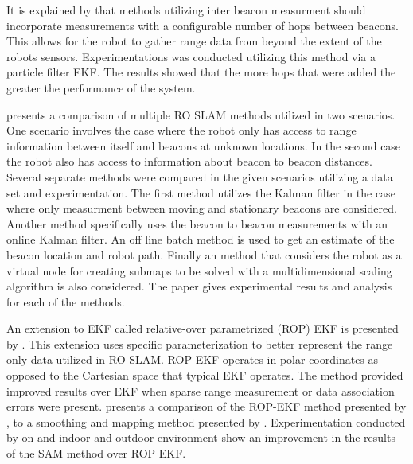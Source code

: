 \documentclass[conference]{IEEEtran}
\begin{document}
	\FloatBarrier
	
	
	
	It is explained by \cite{Torres-Gonzalez2015} that methods utilizing inter beacon measurment should incorporate measurements with a configurable number of hops between beacons. This allows for the robot to gather range data from beyond the extent of the robots sensors. Experimentations was conducted utilizing this method via a particle filter EKF. The results showed that the more hops that were added the greater the performance of the system. 
	
	
	
	\cite{Djugash2006} presents a comparison of multiple RO SLAM methods utilized in two scenarios. One scenario involves the case where the robot only has access to range information between itself and beacons at unknown locations. In the second case the robot also has access to information about beacon to beacon distances. Several separate methods were compared in the given scenarios utilizing a data set and experimentation. The first method utilizes the Kalman filter in the case where only measurment between moving and stationary beacons are considered. Another method specifically uses the beacon to beacon measurements with an online Kalman filter. An off line batch method is used to get an estimate of the beacon location and robot path. Finally an method that considers the robot as a virtual node for creating submaps to be solved with a multidimensional scaling algorithm is also considered. The paper gives experimental results and analysis for each of the methods. 
	
	
	
	
	
	
	
	
	
	An extension to EKF called relative-over parametrized (ROP) EKF is presented by \cite{Djugash2008}. This extension uses specific parameterization to  better represent the range only data utilized in RO-SLAM. ROP EKF operates in polar coordinates as opposed to the Cartesian space that typical EKF operates. The method provided improved results over EKF when sparse range measurement or data association errors were present. \cite{Herranz2014} presents a comparison of the ROP-EKF method presented by \cite{Djugash2008}, to a smoothing and mapping method presented by \cite{Dellaert2006}. Experimentation conducted by \cite{Herranz2014} on and indoor and outdoor environment show an improvement in the results of the SAM method over ROP EKF.
	
\end{document}
